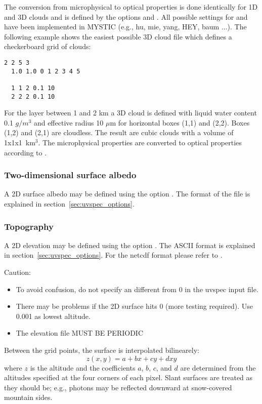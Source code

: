 {The conversion from microphysical to optical properties 
is done identically for 1D and 3D clouds and is defined 
by the options  and . All
possible settings for  and 
have been implemented in MYSTIC (e.g., hu, mie, yang, HEY, baum ...).
The following example shows the easiest possible 3D 
cloud file which defines a checkerboard grid of clouds:
\begin{Verbatim}[fontsize=\footnotesize, frame=single, samepage=true]
  2 2 5 3
  1.0 1.0 0 1 2 3 4 5 

  1 1 2 0.1 10
  2 2 2 0.1 10
\end{Verbatim}
For the layer between 1 and 2 km a 3D cloud is defined with liquid water
content 0.1 $g/m^3$ and effective radius 10 $\mu$m for horizontal 
boxes (1,1) and (2,2). Boxes (1,2) and (2,1) are cloudless. The result are
cubic clouds with a volume of 1x1x1~km$^3$. The microphysical properties are
converted to optical properties according to .  

\subsubsection{Two-dimensional surface albedo}

A 2D surface albedo may be defined using the option
. The format of the file is explained in
section~\ref{sec:uvspec_options}. 

\subsubsection{Topography}

A 2D elevation may be defined using the option 
. The ASCII format is explained in
section~\ref{sec:uvspec_options}. For the netcdf format please refer
to . 

Caution:
\begin{itemize}
\item To avoid confusion, do not specify an  different
  from 0 in the uvspec input file.
\item There may be problems if the 2D surface hits 0 
  (more testing required). Use 0.001 as lowest altitude.
\item  The elevation file MUST BE PERIODIC
\end{itemize}

Between the grid points, the surface is interpolated 
bilinearely: 
\begin{equation}
  z(x,y) = a + bx + cy + dxy
\end{equation}
where $z$ is the altitude and the coefficients $a$, $b$, $c$, and $d$
are determined from 
the altitudes specified at the four corners of each pixel.
Slant surfaces are treated as they should be; e.g., photons
may be reflected downward at snow-covered mountain sides.

}
